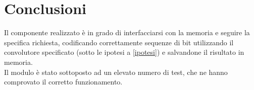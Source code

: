 \documentclass{article}
\begin{document}

\section{Conclusioni}
Il componente realizzato è in grado di interfacciarsi con la memoria e seguire la specifica richiesta, codificando correttamente sequenze di bit utilizzando il convolutore specificato (sotto le ipotesi a \ref{ipotesi}) e salvandone il risultato in memoria.\\
Il modulo è stato sottoposto ad un elevato numero di test, che ne hanno comprovato il corretto funzionamento.\\
\end{document}
